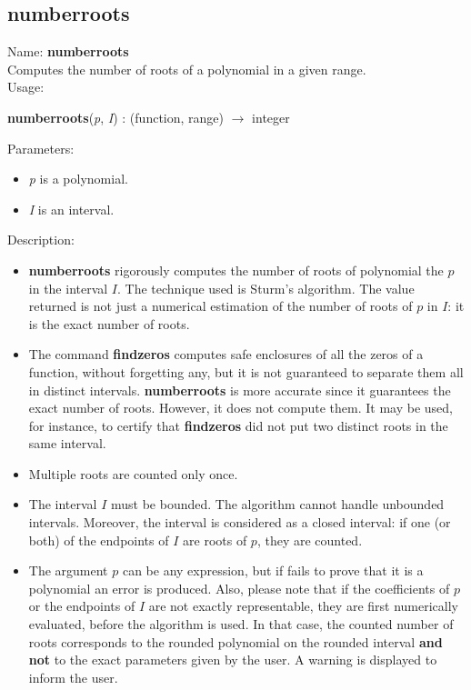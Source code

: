 \subsection{numberroots}
\label{labnumberroots}
\noindent Name: \textbf{numberroots}\\
Computes the number of roots of a polynomial in a given range.\\
\noindent Usage: 
\begin{center}
\textbf{numberroots}(\emph{p}, \emph{I}) : (\textsf{function}, \textsf{range}) $\rightarrow$ \textsf{integer}\\
\end{center}
Parameters: 
\begin{itemize}
\item \emph{p} is a polynomial.
\item \emph{I} is an interval.
\end{itemize}
\noindent Description: \begin{itemize}

\item \textbf{numberroots} rigorously computes the number of roots of polynomial the $p$ in the interval $I$. The technique used is Sturm's algorithm. The value returned is not just a numerical estimation of the number of roots of $p$ in $I$: it is the exact number of roots.

\item The command \textbf{findzeros} computes safe enclosures of all the zeros of a function, without forgetting any, but it is not guaranteed to separate them all in distinct intervals. \textbf{numberroots} is more accurate since it guarantees the exact number of roots. However, it does not compute them. It may be used, for instance, to certify that \textbf{findzeros} did not put two distinct roots in the same interval.

\item Multiple roots are counted only once.

\item The interval $I$ must be bounded. The algorithm cannot handle unbounded intervals. Moreover, the interval is considered as a closed interval: if one (or both) of the endpoints of $I$ are roots of $p$, they are counted.

\item The argument $p$ can be any expression, but if \sollya fails to prove that it is a polynomial an error is produced. Also, please note that if the coefficients of $p$ or the endpoints of $I$ are not exactly representable, they are first numerically evaluated, before the algorithm is used. In that case, the counted number of roots corresponds to the rounded polynomial on the rounded interval \textbf{and not} to the exact parameters given by the user. A warning is displayed to inform the user.
\end{itemize}
